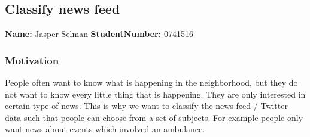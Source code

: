 \subsection{Classify news feed}
\textbf{Name:} Jasper Selman \indent \textbf{StudentNumber:} 0741516

\subsubsection*{Motivation}
People often want to know what is happening in the neighborhood, but they do not want to know every little thing that is happening.
They are only interested in certain type of news. This is why we want to classify the news feed / Twitter data such that people can choose from a set of subjects. For example people only want news about events which involved an ambulance. 

